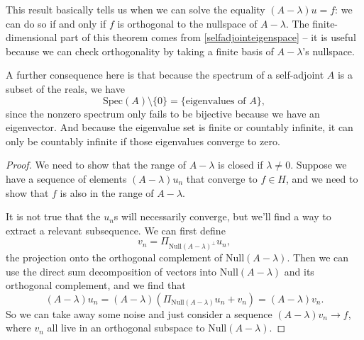 This result basically tells us when we can solve the equality $(A - \lambda)u = f$: we can do so if and only if $f$ is orthogonal to the nullspace of $A - \lambda$. The finite-dimensional part of this theorem comes from \cref{selfadjointeigenspace} -- it is useful because we can check orthogonality by taking a finite basis of $A - \lambda$'s nullspace. 

A further consequence here is that because the spectrum of a self-adjoint $A$ is a subset of the reals, we have
\[
    \text{Spec}(A) \setminus \{0\} = \{\text{eigenvalues of }A\},
\]
since the nonzero spectrum only fails to be bijective because we have an eigenvector. And because the eigenvalue set is finite or countably infinite, it can only be countably infinite if those eigenvalues converge to zero. 

\begin{proof}
We need to show that the range of $A - \lambda$ is closed if $\lambda \ne 0$. Suppose we have a sequence of elements $(A - \lambda)u_n$ that converge to $f \in H$, and we need to show that $f$ is also in the range of $A - \lambda$. 

It is not true that the $u_n$s will necessarily converge, but we'll find a way to extract a relevant subsequence. We can first define
\[
    v_n = \Pi_{\text{Null}(A - \lambda)^\perp} u_n,
\]
the projection onto the orthogonal complement of $\text{Null}(A - \lambda)$. Then we can use the direct sum decomposition of vectors into $\text{Null}(A - \lambda)$ and its orthogonal complement, and we find that
\[
    (A - \lambda) u_n = (A - \lambda) \left(\Pi_{\text{Null}(A - \lambda)} u_n+ v_n\right) =  (A - \lambda) v_n.
\]
So we can take away some noise and just consider a sequence $(A - \lambda) v_n \to f$, where $v_n$ all live in an orthogonal subspace to $\text{Null}(A - \lambda)$. 


\end{proof}
